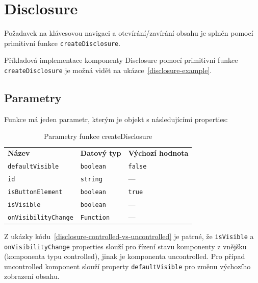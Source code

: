 \section{Disclosure}

Požadavek na klávesovou navigaci \hyperref[ofr11]{} a otevírání/zavírání obsahu \hyperref[dfr11]{} je splněn pomocí primitivní funkce \texttt{createDisclosure}.

Příkladová implementace komponenty Disclosure pomocí primitivní funkce \texttt{createDisclosure} je možná vidět na ukázce~\ref{disclosure-example}.

\subsection{Parametry}

Funkce má jeden parametr, kterým je objekt s následujícími properties:

\begin{table}[ht]\label{table:disclosure-params}
    \begin{ctucolortab}
        \begin{tabularx}{\textwidth}{X X X}
            \bfseries Název             & \bfseries Datový typ & \bfseries Výchozí hodnota \\\Midrule{}
            \texttt{defaultVisible}     & \texttt{boolean}     & \texttt{false}            \\
            \texttt{id}                 & \texttt{string}      & ---                       \\
            \texttt{isButtonElement}    & \texttt{boolean}     & \texttt{true}             \\
            \texttt{isVisible}          & \texttt{boolean}     & ---                       \\
            \texttt{onVisibilityChange} & \texttt{Function}    & ---
        \end{tabularx}
    \end{ctucolortab}
    \caption{Parametry funkce createDisclosure}
\end{table}

Z ukázky kódu~\ref{disclosure-controlled-vs-uncontrolled} je patrné, že \texttt{isVisible} a \texttt{onVisibilityChange} properties slouží pro řízení stavu komponenty z vnějšku (komponenta typu controlled), jinak je komponenta uncontrolled.
Pro případ uncontrolled komponent slouží property \texttt{defaultVisible} pro změnu výchozího zobrazení obsahu.


